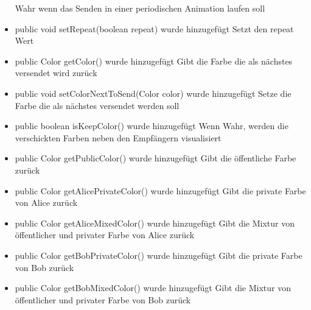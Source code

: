 \documentclass{article}
\begin{document}
\begin{itemize}
               Wahr wenn das Senden in einer periodischen Animation laufen soll
           \item public void setRepeat(boolean repeat) wurde hinzugefügt\newline
               Setzt den repeat Wert
           \item public Color getColor() wurde hinzugefügt\newline
               Gibt die Farbe die als nächstes versendet wird zurück
           \item public void setColorNextToSend(Color color) wurde hinzugefügt\newline
               Setze die Farbe die als nächstes versendet werden soll
           \item public boolean isKeepColor() wurde hinzugefügt\newline
               Wenn Wahr, werden die verschickten Farben neben den Empfängern visualisiert
           \item public Color getPublicColor() wurde hinzugefügt\newline
               Gibt die öffentliche Farbe zurück
           \item public Color getAlicePrivateColor() wurde hinzugefügt\newline
               Gibt die private Farbe von Alice zurück
           \item public Color getAliceMixedColor() wurde hinzugefügt\newline
               Gibt die Mixtur von öffentlicher und privater Farbe von Alice zurück
           \item public Color getBobPrivateColor() wurde hinzugefügt\newline
               Gibt die private Farbe von Bob zurück
           \item public Color getBobMixedColor() wurde hinzugefügt\newline
               Gibt die Mixtur von öffentlicher und privater Farbe von Bob zurück
           \end{itemize}
\end{document}

